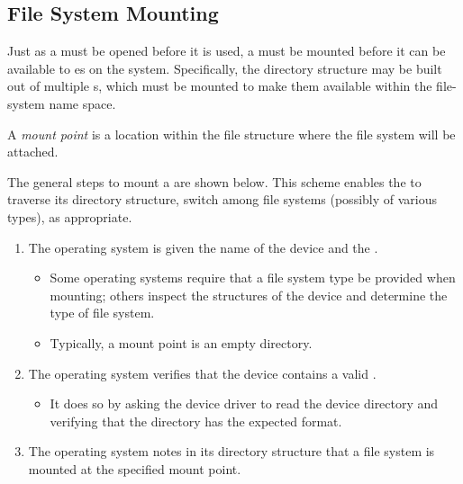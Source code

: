 \subsection{File System Mounting}\label{subsec:File_System_Mounting}
Just as a  must be opened before it is used, a  must be mounted before it can be available to es on the system.
Specifically, the directory structure may be built out of multiple s, which must be mounted to make them available within the file-system name space.

\begin{definition}\label{def:Mount_Point}
  A \emph{mount point} is a location within the file structure where the file system will be attached.
\end{definition}

The general steps to mount a  are shown below.
This scheme enables the  to traverse its directory structure, switch among file systems (possibly of various types), as appropriate.
\begin{enumerate}[noitemsep]
\item The operating system is given the name of the device and the .
  \begin{itemize}[noitemsep]
  \item Some operating systems require that a file system type be provided when mounting; others inspect the structures of the device and determine the type of file system.
  \item Typically, a mount point is an empty directory.
  \end{itemize}

\item The operating system verifies that the device contains a valid .
  \begin{itemize}[noitemsep]
  \item It does so by asking the device driver to read the device directory
and verifying that the directory has the expected format.
\end{itemize}

\item The operating system notes in its directory structure that a file system is mounted at the specified mount point.
\end{enumerate}


